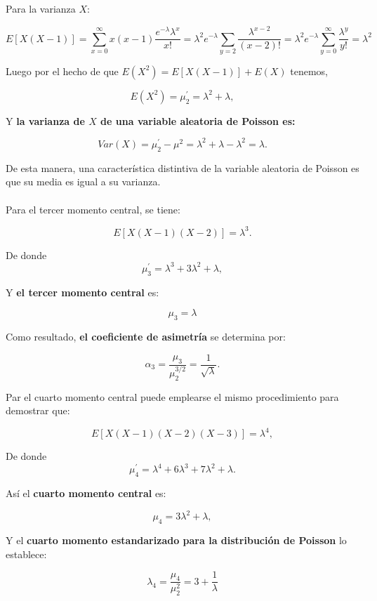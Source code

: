 Para la varianza $X$:

$$E[X(X-1)]=\sum_{x=0}^\infty x(x-1)\dfrac{e^{-\lambda}\lambda^x}{x!}=\lambda^2e^{-\lambda}\sum_{y=2}\dfrac{\lambda^{x-2}}{(x-2)!}=\lambda^2e^{-\lambda}\sum_{y=0}^\infty \dfrac{\lambda^y}{y!}=\lambda^2$$

Luego por el hecho de que $E(X^2)=E[X(X-1)]+E(X)$ tenemos,

$$E(X^2)=\mu^{'}_2 = \lambda^2 + \lambda,$$

Y \textbf{\boldmath la varianza de $X$ de una variable aleatoria de Poisson es:}

\begin{tcolorbox}
    $$Var(X)=\mu_2^{'}-\mu^2=\lambda^2+\lambda - \lambda^2 = \lambda.$$
\end{tcolorbox}

De esta manera, una característica distintiva de la variable aleatoria de Poisson  es que su media es igual a su varianza.\\\\

Para el tercer momento central, se tiene:

$$E[X(X-1)(X-2)]=\lambda^3.$$

De donde $$\mu_3^{'}=\lambda^3+3\lambda^2 + \lambda,$$

Y \textbf{el tercer momento central} es:

\begin{tcolorbox}
$$\mu_3=\lambda$$
\end{tcolorbox}

Como resultado, \textbf{el coeficiente de asimetría} se determina por:

\begin{tcolorbox}
    $$\alpha_3=\dfrac{\mu_3}{\mu_2^{3/2}}=\dfrac{1}{\sqrt{\lambda}}.$$
\end{tcolorbox}

Par el cuarto momento central puede emplearse el mismo procedimiento para demostrar que:

$$E[X(X-1)(X-2)(X-3)]=\lambda^4,$$

De donde 
$$\mu_4^{'}=\lambda^4+6\lambda^3 + 7\lambda^2+\lambda.$$

Así el \textbf{cuarto momento central} es:

$$\mu_4 = 3\lambda^2 + \lambda,$$

Y el \textbf{cuarto momento estandarizado para la distribución de Poisson} lo establece:

$$\lambda_4 = \dfrac{\mu_4}{\mu_2^2}=3+\dfrac{1}{\lambda}$$

